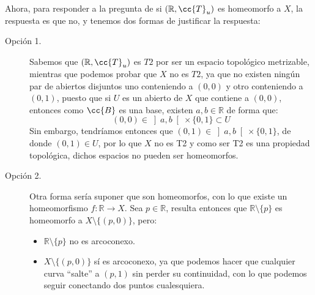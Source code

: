 \begin{ejercicio}
    \noindent
    Ahora, para responder a la pregunta de si $(\mathbb{R},\cc{T}_u)$ es homeomorfo a $X$, la respuesta es que no, y tenemos dos formas de justificar la respuesta:
    \begin{description}
        \item [Opción 1.] Sabemos que $(\mathbb{R},\cc{T}_u)$ es $T2$ por ser un espacio topológico metrizable, mientras que podemos probar que $X$ no es $T2$, ya que no existen ningún par de abiertos disjuntos uno conteniendo a $(0,0)$ y otro conteniendo a $(0,1)$, puesto que si $U$ es un abierto de $X$ que contiene a $(0,0)$, entonces como $\cc{B}$ es una base, existen $a,b\in \mathbb{R}$ de forma que:
            \begin{equation*}
                (0,0) \in \left]a,b\right[\times \{0,1\} \subset U
            \end{equation*}
            Sin embargo, tendríamos entonces que $(0,1)\in \left]a,b\right[\times \{0,1\}$, de donde $(0,1)\in U$, por lo que $X$ no es T2 y como ser T2 es una propiedad topológica, dichos espacios no pueden ser homeomorfos.
        \item [Opción 2.] Otra forma sería suponer que son homeomorfos, con lo que existe un homeomorfismo $f:\mathbb{R}\to X$. Sea $p\in \mathbb{R}$, resulta entonces que $\mathbb{R}\setminus \{p\}$ es homeomorfo a $X\setminus \{(p,0)\}$, pero:
            \begin{itemize}
                \item $\mathbb{R}\setminus\{p\}$ no es arcoconexo.
                \item $X\setminus \{(p,0)\}$ sí es arcoconexo, ya que podemos hacer que cualquier curva ``salte'' a $(p,1)$ sin perder su continuidad, con lo que podemos seguir conectando dos puntos cualesquiera.
            \end{itemize}
    \end{description}
\end{ejercicio}

